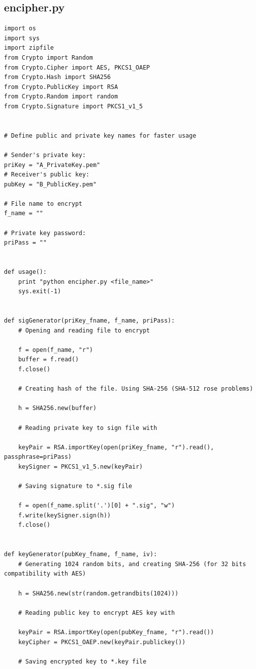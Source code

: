 \documentclass[a4paper,11pt,openright,oneside]{report}
\begin{document}
\begin{appendices}
\section{encipher.py}
\label{App:encipher.py}

\begin{verbatim}
import os
import sys
import zipfile
from Crypto import Random
from Crypto.Cipher import AES, PKCS1_OAEP
from Crypto.Hash import SHA256
from Crypto.PublicKey import RSA
from Crypto.Random import random
from Crypto.Signature import PKCS1_v1_5


# Define public and private key names for faster usage

# Sender's private key:
priKey = "A_PrivateKey.pem"
# Receiver's public key:
pubKey = "B_PublicKey.pem"

# File name to encrypt
f_name = ""

# Private key password:
priPass = ""


def usage():
    print "python encipher.py <file_name>"
    sys.exit(-1)


def sigGenerator(priKey_fname, f_name, priPass):
    # Opening and reading file to encrypt

    f = open(f_name, "r")
    buffer = f.read()
    f.close()

    # Creating hash of the file. Using SHA-256 (SHA-512 rose problems)

    h = SHA256.new(buffer)

    # Reading private key to sign file with

    keyPair = RSA.importKey(open(priKey_fname, "r").read(), passphrase=priPass)
    keySigner = PKCS1_v1_5.new(keyPair)

    # Saving signature to *.sig file

    f = open(f_name.split('.')[0] + ".sig", "w")
    f.write(keySigner.sign(h))
    f.close()


def keyGenerator(pubKey_fname, f_name, iv):
    # Generating 1024 random bits, and creating SHA-256 (for 32 bits compatibility with AES)

    h = SHA256.new(str(random.getrandbits(1024)))

    # Reading public key to encrypt AES key with

    keyPair = RSA.importKey(open(pubKey_fname, "r").read())
    keyCipher = PKCS1_OAEP.new(keyPair.publickey())

    # Saving encrypted key to *.key file


\end{verbatim}
\end{appendices}
\end{document}
